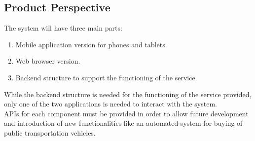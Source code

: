 \subsection{Product Perspective}
The system will have three main parts:
\begin{enumerate}
\item Mobile application version for phones and tablets.
\item Web browser version.
\item Backend structure to support the functioning of the service.
\end{enumerate}
While the backend structure is needed for the functioning of the service provided, only one of the two applications is needed to interact with the system.\\
APIs for each component must be provided in order to allow future development and introduction of new functionalities like an automated system for buying of public transportation vehicles.
